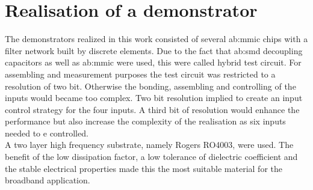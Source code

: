 \chapter{Realisation of a demonstrator}
The demonstrators realized in this work consisted of several \gls{ab:mmic} chips with a filter network built by discrete elements.
Due to the fact that \gls{ab:smd} decoupling capacitors as well as \gls{ab:mmic} were used, this were called hybrid test circuit.
For assembling and measurement purposes the test circuit was restricted to a resolution of two bit.
Otherwise the bonding, assembling and controlling of the inputs would became too complex.
Two bit resolution implied to create an input control strategy for the four inputs.
A third bit of resolution would enhance the performance but also increase the complexity of the realisation as six inputs needed to e controlled.
\\
A two layer high frequency substrate, namely Rogers RO4003, were used.
The benefit of the low dissipation factor, a low tolerance of dielectric coefficient and the stable electrical properties made this the most suitable material for the broadband application. %


